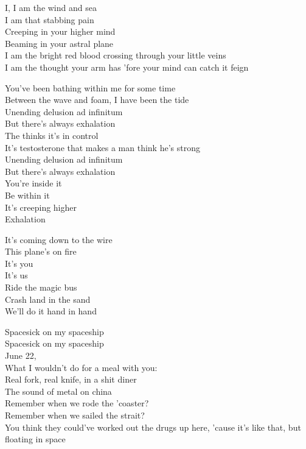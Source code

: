 I, I am the wind and sea\\
I am that stabbing pain\\
Creeping in your higher mind\\
Beaming in your astral plane\\
I am the bright red blood crossing through your little veins\\
I am the thought your arm has 'fore your mind can catch it feign\\


You've been bathing within me for some time\\
Between the wave and foam, I have been the tide\\
Unending delusion ad infinitum\\
But there's always exhalation\\
The  thinks it's in control\\
It's testosterone that makes a man think he's strong\\
Unending delusion ad infinitum\\
But there's always exhalation\\

You're inside it\\
Be within it\\
It's creeping higher\\
Exhalation\\


It's coming down to the wire\\
This plane's on fire\\
It's you\\
It's us\\
Ride the magic bus\\
Crash land in the sand\\
We'll do it hand in hand\\




Spacesick on my spaceship\\
Spacesick on my spaceship\\

June 22,\\
What I wouldn't do for a meal with you:\\
Real fork, real knife, in a shit diner\\
The sound of metal on china\\
Remember when we rode the 'coaster?\\
Remember when we sailed the strait?\\
You think they could've worked out the drugs up here, 'cause it's like that, but floating in space\\

